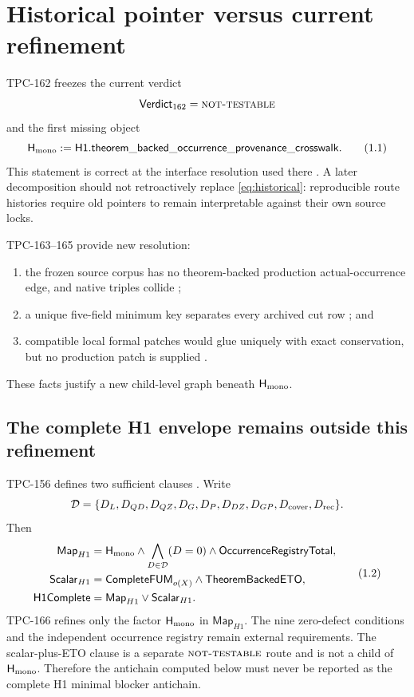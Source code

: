 \documentclass[11pt]{article}
\theoremstyle{definition}
\theoremstyle{remark}
\newcommand{\NT}{\textnormal{\textsc{not-testable}}}
\newcommand{\Hmono}{\mathsf H_{\rm mono}}
\begin{document}
\section{Historical pointer versus current refinement}

TPC-162 freezes the current verdict
\[
 \mathsf{Verdict}_{162}=\NT
\]
and the first missing object
\[
 \Hmono:=
 \mathsf{H1.theorem\_backed\_occurrence\_provenance\_crosswalk}.
 \tag{1.1}\label{eq:historical}
\]
This statement is correct at the interface resolution used there
\citep{WangTPC162}.  A later decomposition should not retroactively
replace \eqref{eq:historical}: reproducible route histories require
old pointers to remain interpretable against their own source locks.

TPC-163--165 provide new resolution:
\begin{enumerate}[leftmargin=2.1em]
 \item the frozen source corpus has no theorem-backed production
       actual-occurrence edge, and native triples collide
       \citep{WangTPC163};
 \item a unique five-field minimum key separates every archived cut
       row \citep{WangTPC164}; and
 \item compatible local formal patches would glue uniquely with exact
       conservation, but no production patch is supplied
       \citep{WangTPC165}.
\end{enumerate}
These facts justify a new child-level graph beneath \(\Hmono\).

\subsection{The complete H1 envelope remains outside this refinement}

TPC-156 defines two sufficient clauses \citep{WangTPC156}.  Write
\[
\mathcal D=
\{D_L,D_{QD},D_{QZ},D_G,D_P,D_{DZ},D_{GP},
  D_{\rm cover},D_{\rm rec}\}.
\]
Then
\[
\begin{aligned}
\mathsf{Map}_{H1}
 &=
 \Hmono\wedge
 \bigwedge_{D\in\mathcal D}(D=0)
 \wedge\mathsf{OccurrenceRegistryTotal},\\
\mathsf{Scalar}_{H1}
 &=
 \mathsf{CompleteFUM}_{o(X)}
 \wedge\mathsf{TheoremBackedETO},\\
\mathsf{H1Complete}
 &=\mathsf{Map}_{H1}\vee\mathsf{Scalar}_{H1}.
\end{aligned}
\tag{1.2}\label{eq:full-h1}
\]
TPC-166 refines only the factor \(\Hmono\) in
\(\mathsf{Map}_{H1}\).  The nine zero-defect conditions and the
independent occurrence registry remain external requirements.  The
scalar-plus-ETO clause is a separate \(\NT\) route and is not a child
of \(\Hmono\).  Therefore the antichain computed below must never be
reported as the complete H1 minimal blocker antichain.
\end{document}
